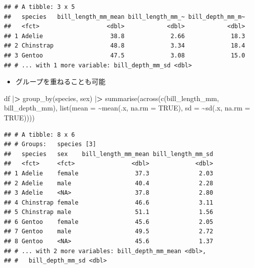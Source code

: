 \documentclass[
  xelatex,ja=standard, b5paper]{bxjsbook}
\newenvironment{Shaded}{\begin{snugshade}}{\end{snugshade}}
\newcommand{\AttributeTok}[1]{\textcolor[rgb]{0.77,0.63,0.00}{#1}}
\newcommand{\ConstantTok}[1]{\textcolor[rgb]{0.00,0.00,0.00}{#1}}
\newcommand{\ErrorTok}[1]{\textcolor[rgb]{0.64,0.00,0.00}{\textbf{#1}}}
\newcommand{\FunctionTok}[1]{\textcolor[rgb]{0.00,0.00,0.00}{#1}}
\newcommand{\NormalTok}[1]{#1}
\newcommand{\SpecialCharTok}[1]{\textcolor[rgb]{0.00,0.00,0.00}{#1}}
\providecommand{\tightlist}{%
  \setlength{\itemsep}{0pt}\setlength{\parskip}{0pt}}
\begin{document}
\begin{verbatim}
## # A tibble: 3 x 5
##   species   bill_length_mm_mean bill_length_mm_~ bill_depth_mm_m~
##   <fct>                   <dbl>            <dbl>            <dbl>
## 1 Adelie                   38.8             2.66             18.3
## 2 Chinstrap                48.8             3.34             18.4
## 3 Gentoo                   47.5             3.08             15.0
## # ... with 1 more variable: bill_depth_mm_sd <dbl>
\end{verbatim}

\begin{itemize}
\tightlist
\item
  グループを重ねることも可能
\end{itemize}

\begin{Shaded}
\begin{Highlighting}[]
\NormalTok{df }\SpecialCharTok{|}\ErrorTok{\textgreater{}} 
  \FunctionTok{group\_by}\NormalTok{(species, sex) }\SpecialCharTok{|}\ErrorTok{\textgreater{}} 
  \FunctionTok{summarise}\NormalTok{(}\FunctionTok{across}\NormalTok{(}\FunctionTok{c}\NormalTok{(bill\_length\_mm, bill\_depth\_mm),}
                   \FunctionTok{list}\NormalTok{(}\AttributeTok{mean =} \SpecialCharTok{\textasciitilde{}}\FunctionTok{mean}\NormalTok{(.x, }\AttributeTok{na.rm =} \ConstantTok{TRUE}\NormalTok{),}
                        \AttributeTok{sd =} \SpecialCharTok{\textasciitilde{}}\FunctionTok{sd}\NormalTok{(.x, }\AttributeTok{na.rm =} \ConstantTok{TRUE}\NormalTok{))))}
\end{Highlighting}
\end{Shaded}

\begin{verbatim}
## # A tibble: 8 x 6
## # Groups:   species [3]
##   species   sex    bill_length_mm_mean bill_length_mm_sd
##   <fct>     <fct>                <dbl>             <dbl>
## 1 Adelie    female                37.3              2.03
## 2 Adelie    male                  40.4              2.28
## 3 Adelie    <NA>                  37.8              2.80
## 4 Chinstrap female                46.6              3.11
## 5 Chinstrap male                  51.1              1.56
## 6 Gentoo    female                45.6              2.05
## 7 Gentoo    male                  49.5              2.72
## 8 Gentoo    <NA>                  45.6              1.37
## # ... with 2 more variables: bill_depth_mm_mean <dbl>,
## #   bill_depth_mm_sd <dbl>
\end{verbatim}
\end{document}
